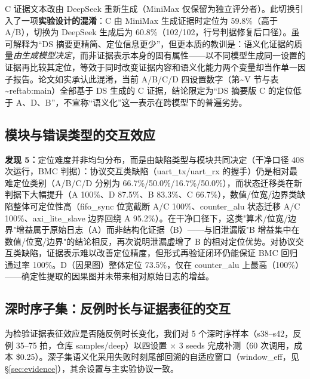 \documentclass[journal]{IEEEtran}
\begin{document}
C 证据文本改由 DeepSeek 重新生成（MiniMax 仅保留为独立评分者）。此切换引入了一项\textbf{实验设计的混淆}：C 由 MiniMax 生成证据时定位为 59.8\%（高于 A/B），切换为 DeepSeek 生成后为 60.8\%（102/102，行号判据修复后口径）。虽可解释为\textquotedblleft DS 摘要更精简、定位信息更少\textquotedblright，但更本质的教训是：语义化证据的质量\textit{由生成模型决定}，而非证据表示本身的固有属性——以不同模型生成同一设置的证据再比较其定位，等效于同时改变证据内容和语义化能力两个变量却当作单一因子报告。论文如实承认此混淆，当前 A/B/C/D 四设置数字（第\~{}V 节与表\~{}ref{tab:main}）全部基于 DS 生成的 C 证据，结论限定为\textquotedblleft DS 摘要版 C 的定位低于 A、D、B\textquotedblright，不宣称\textquotedblleft 语义化\textquotedblright 这一表示在跨模型下的普遍劣势。



\subsection{模块与错误类型的交互效应}

\textbf{发现 5：}定位难度并非均匀分布，而是由缺陷类型与模块共同决定（干净口径 408 次运行，BMC 判据）：协议交互类缺陷（uart\_tx/uart\_rx 的握手）仍是相对最难定位类别（A/B/C/D 分别为 66.7\%/50.0\%/16.7\%/50.0\%），而状态迁移类在新判据下大幅提升（A 100\%、D 87.5\%、B 83.3\%、C 66.7\%），数值/位宽/边界类缺陷整体可定位性高（fifo\_sync 位宽截断 A/C 100\%、counter\_alu 状态迁移 A/C 100\%、axi\_lite\_slave 边界回绕 A 95.2\%）。在干净口径下，这类"算术/位宽/边界"增益属于原始日志（A）而非结构化证据（B）——与旧泄漏版"B 增益集中在数值/位宽/边界"的结论相反，再次说明泄漏虚增了 B 的相对定位优势。对协议交互类缺陷，证据表示难以改善定位精度，但形式再验证闭环仍能保证 BMC 回归通过率 100\%。D（因果图）整体定位 73.5\%，仅在 counter\_alu 上最高（100\%）——确定性提取的因果图并未带来相对原始日志的增益。

\subsection{深时序子集：反例时长与证据表征的交互}\label{sec:deep}

为检验证据表征效应是否随反例时长变化，我们对 5 个深时序样本（s38--s42，反例 35--75 拍，仓库 samples/deep）以四设置 $\times$ 3 seeds 完成补测（60 次调用，成本 \$0.25）。深子集语义化采用失败时刻尾部回溯的自适应窗口（window\_eff，见 \S\ref{sec:evidence}），其余设置与主实验协议一致。
\end{document}
